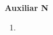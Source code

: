 

\header
\begin{center}
	\LARGE \bf{Auxiliar N}
\end{center}

\begin{enumerate}[label ={\bf P\arabic*}]
	\item 
\end{enumerate}
